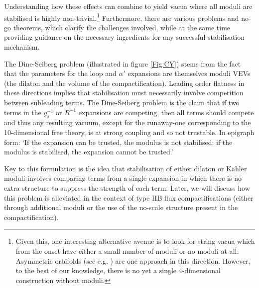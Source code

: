  Understanding how these effects can combine to yield vacua where all moduli are stabilised is highly non-trivial.\footnote{Given this, one interesting alternative avenue is to look for string vacua which from the onset have either a small number of moduli or no moduli at all. Asymmetric orbifolds (see e.g. \cite{Narain:1986qm, Blumenhagen:2000fp, Silverstein:2001xn}) are one approach in this direction. However, to the best of our knowledge, there is no yet a single 4-dimensional construction without moduli.} Furthermore, there are various problems and no-go theorems, which clarify the challenges involved, while at the same time providing guidance on the necessary ingredients for any successful stabilisation mechanism.

\smallskip
{}  The Dine-Seiberg problem (illustrated in figure \ref{Fig:CY}) stems from the fact that the 
parameters for the loop and $\alpha'$ expansions are themselves moduli VEVs (the dilaton and the volume of the compactification). Leading order flatness in these directions implies that stabilisation must necessarily involve competition between subleading terms. The Dine-Seiberg problem is the claim that if two terms in the $g_s^{-1}$ or $R^{-1}$ expansions are competing, then all terms should compete and thus any resulting vacuum, except for the runaway-one corresponding to the 10-dimensional free theory,  is at strong coupling and so not trustable. In epigraph form: `If the expansion can be trusted, the modulus is not stabilised; if the modulus is stabilised, the expansion cannot be trusted.'

Key to this formulation is the idea that stabilisation of either dilaton or K\"ahler moduli involves comparing terms from a single expansion in which there is no extra structure to suppress the strength of each term. Later, we will discuss how this problem is alleviated in the context of type IIB flux compactifications (either through additional moduli or the use of the no-scale structure present in the compactification).\\


